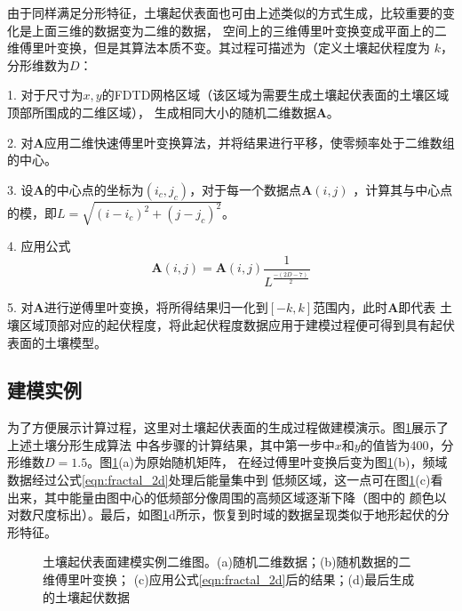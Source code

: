 由于同样满足分形特征，土壤起伏表面也可由上述类似的方式生成，比较重要的变化是上面三维的数据变为二维的数据，
空间上的三维傅里叶变换变成平面上的二维傅里叶变换，但是其算法本质不变。其过程可描述为（定义土壤起伏程度为
$k$，分形维数为$D$：

1. 对于尺寸为$x,y$的FDTD网格区域（该区域为需要生成土壤起伏表面的土壤区域顶部所围成的二维区域），
生成相同大小的随机二维数据$\mathbf{A}$。

2. 对$\mathbf{A}$应用二维快速傅里叶变换算法，并将结果进行平移，使零频率处于二维数组
的中心。

3. 设$\mathbf{A}$的中心点的坐标为$(i_c,j_c)$，对于每一个数据点$\mathbf{A}(i,j)$
，计算其与中心点的模，即$L=\sqrt{(i - i_c)^2 + (j - j_c)^2}$。

4. 应用公式 
\begin{equation}
	\label{eqn:fractal_2d}
	\mathbf{A}(i,j) = \mathbf{A}(i,j) \frac{1}{L^{\frac{-(2 D-7)}{2}}}
\end{equation}

5. 对$\mathbf{A}$进行逆傅里叶变换，将所得结果归一化到$[-k,k]$范围内，此时$\mathbf{A}$即代表
土壤区域顶部对应的起伏程度，将此起伏程度数据应用于建模过程便可得到具有起伏表面的土壤模型。
\subsection{建模实例}
为了方便展示计算过程，这里对土壤起伏表面的生成过程做建模演示。图\ref{rough_surface}展示了上述土壤分形生成算法
中各步骤的计算结果，其中第一步中$x$和$y$的值皆为400，分形维数$D=1.5$。图\ref{rough_surface}(a)为原始随机矩阵，
在经过傅里叶变换后变为图\ref{rough_surface}(b)，频域数据经过公式\ref{eqn:fractal_2d}处理后能量集中到
低频区域，这一点可在图\ref{rough_surface}(c)看出来，其中能量由图中心的低频部分像周围的高频区域逐渐下降（图中的
颜色以对数尺度标出）。最后，如图\ref{rough_surface}{d}所示，恢复到时域的数据呈现类似于地形起伏的分形特征。
\begin{figure}[htbp]
	\caption{土壤起伏表面建模实例二维图。(a)随机二维数据；(b)随机数据的二维傅里叶变换；
	(c)应用公式\ref{eqn:fractal_2d}后的结果；(d)最后生成的土壤起伏数据}
	\label{rough_surface}
\end{figure}

